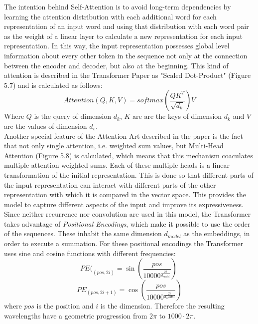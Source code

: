 \documentclass[a4paper, 11pt,titlepage,oneside,openany]{book}
\begin{document}
\noindent The intention behind Self-Attention is to avoid long-term dependencies by learning the attention distribution with each additional word for each representation of an input word and using that distribution with each word pair as the weight of a linear layer to calculate a new representation for each input representation. In this way, the input representation possesses global level information about every other token in the sequence not only at the connection between the encoder and decoder, but also at the beginning. This kind of attention is described in the Transformer Paper as "Scaled Dot-Product" (Figure 5.7) and is calculated as follows:
\[
Attention(Q,K,V)=softmax(\frac{QK^T}{\sqrt{d_k}})V
\]
Where $Q$ is the query of  dimension $d_k$, $K$ are are the keys of dimension $d_k$ and $V$ are the values of dimension $d_v$. \\
\noindent Another special feature of the Attention Art described in the paper is the fact that not only single attention, i.e. weighted sum values, but Multi-Head Attention (Figure 5.8) is calculated, which means that this mechanism coaculates multiple attention weighted sums. Each of these multiple heads is a linear transformation of the initial representation. This is done so that different parts of the input representation can interact with different parts of the other representation with which it is compared in the vector space. This provides the model to capture different aspects of the input and improve its expressiveness.\\

\noindent Since neither recurrence nor convolution are used in this model, the Transformer takes advantage of \textit{Positional Encodings}, which make it possible to use the order of the sequences. These inhabit the same  dimension $d_{model}$ as the embeddings, in order to execute a summation. For these positional encodings the Transformer uses sine and cosine functions with different frequencies:
\[
PE(_{(pos,2i)}=\sin (\frac{pos}{10000^{\frac{2i}{d_{model}}}})
\
\]
\[
PE_{(pos,2i+1)}=\cos (\frac{pos}{10000^{\frac{2i}{d_model}}})
\]
where $pos$ is the position and $i$ is the dimension. Therefore the resulting wavelengths have a geometric progression from $2\pi$ to $1000 \cdot 2\pi$.

\newpage
\end{document}
